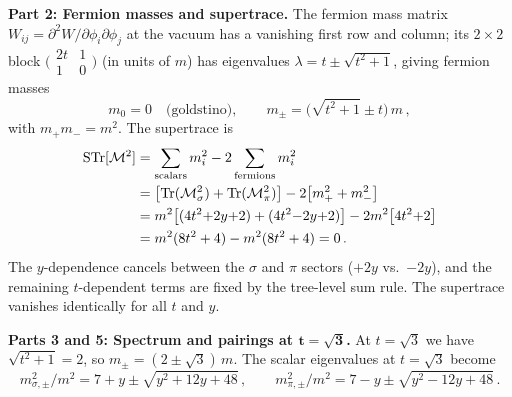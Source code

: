 \bigskip
\textbf{Part 2: Fermion masses and supertrace.}
The fermion mass matrix $W_{ij} = \partial^2 W/\partial\phi_i\partial\phi_j$
at the vacuum has a vanishing first row and column; its $2\times 2$ block
$\bigl(\begin{smallmatrix} 2t & 1 \\ 1 & 0 \end{smallmatrix}\bigr)$ (in units of $m$)
has eigenvalues $\lambda = t \pm \sqrt{t^2+1}$, giving fermion masses
\begin{equation}
  m_0 = 0\quad\text{(goldstino)}, \qquad
  m_\pm = \bigl(\sqrt{t^2+1} \pm t\bigr)\,m\,,
\end{equation}
with $m_+ m_- = m^2$. The supertrace is
\begin{align}
  \mathrm{STr}[\mathcal{M}^2]
  &= \sum_{\text{scalars}} m_i^2 - 2\sum_{\text{fermions}} m_i^2 \notag\\
  &= \bigl[\mathrm{Tr}(\mathcal{M}^2_\sigma) + \mathrm{Tr}(\mathcal{M}^2_\pi)\bigr]
     - 2\bigl[m_+^2 + m_-^2\bigr] \notag\\
  &= m^2\bigl[(4t^2{+}2y{+}2) + (4t^2{-}2y{+}2)\bigr]
     - 2m^2\bigl[4t^2{+}2\bigr] \notag\\
  &= m^2(8t^2+4) - m^2(8t^2+4) = 0\,.
\end{align}
The $y$-dependence cancels between the $\sigma$ and $\pi$ sectors ($+2y$ vs.\
$-2y$), and the remaining $t$-dependent terms are fixed by the tree-level
sum rule. The supertrace vanishes identically for all $t$ and $y$.

\bigskip
\textbf{Parts 3 and 5: Spectrum and pairings at $\boldsymbol{t = \sqrt{3}}$.}
At $t = \sqrt{3}$ we have $\sqrt{t^2+1} = 2$, so $m_\pm = (2 \pm \sqrt{3})\,m$.
The scalar eigenvalues at $t = \sqrt{3}$ become
\[
  m^2_{\sigma,\pm}/m^2 = 7 + y \pm \sqrt{y^2 + 12y + 48}\,, \qquad
  m^2_{\pi,\pm}/m^2 = 7 - y \pm \sqrt{y^2 - 12y + 48}\,.
\]

